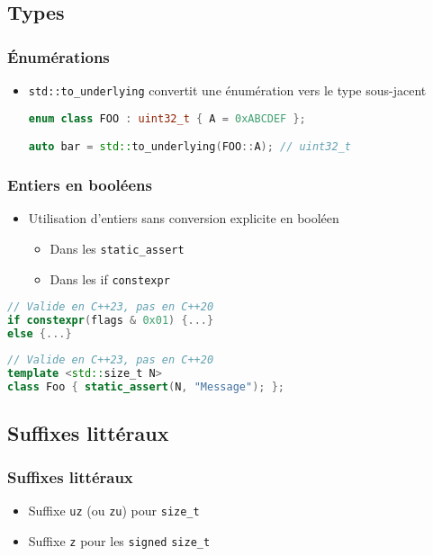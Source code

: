 \documentclass[C++.tex]{subfiles}
\begin{document}
\subsection*{Types}
\begin{frame}[fragile]
	\frametitle{Énumérations}
	\begin{itemize}
		\item \lstinline|std::to_underlying| convertit une énumération vers le type sous-jacent


		\begin{lstlisting}[language=C++]
enum class FOO : uint32_t { A = 0xABCDEF };

auto bar = std::to_underlying(FOO::A); // uint32_t\end{lstlisting}
	\end{itemize}
\end{frame}

\begin{frame}[fragile]
	\frametitle{Entiers en booléens}
	\begin{itemize}
		\item Utilisation d'entiers sans conversion explicite en booléen
		\begin{itemize}
			\item Dans les \lstinline|static_assert|
			\item Dans les if \lstinline|constexpr|
		\end{itemize}
	\end{itemize}

	\begin{lstlisting}[language=C++]
// Valide en C++23, pas en C++20
if constexpr(flags & 0x01) {...}
else {...}\end{lstlisting}

	\begin{lstlisting}[language=C++]
// Valide en C++23, pas en C++20
template <std::size_t N>
class Foo {	static_assert(N, "Message"); };\end{lstlisting}
\end{frame}

\subsection*{Suffixes littéraux}
\begin{frame}[fragile]
	\frametitle{Suffixes littéraux}
	\begin{itemize}
		\item Suffixe \lstinline|uz| (ou \lstinline|zu|) pour \lstinline|size_t|
		\item Suffixe \lstinline|z| pour les \og \lstinline|signed|\fg{} \lstinline|size_t|

	\end{itemize}
\end{frame}
\end{document}
